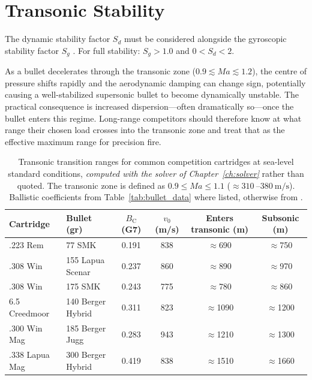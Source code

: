 \documentclass[11pt,twoside,openright]{report}
\newcommand{\Bc}{B_{\mathrm{C}}}
\newcommand{\Mach}{\mathit{Ma}}
\begin{document}
\section{Transonic Stability}

The dynamic stability factor $S_d$ must be considered alongside the gyroscopic stability factor $S_g$ \citep{mccoy1999modern}. For full stability: $S_g > 1.0$ and $0 < S_d < 2$.

As a bullet decelerates through the transonic zone ($0.9 \lesssim \Mach \lesssim 1.2$), the centre of pressure shifts rapidly and the aerodynamic damping can change sign, potentially causing a well-stabilized supersonic bullet to become dynamically unstable. The practical consequence is increased dispersion---often dramatically so---once the bullet enters this regime. Long-range competitors should therefore know at what range their chosen load crosses into the transonic zone and treat that as the effective maximum range for precision fire.

\begin{table}[H]
\centering
\caption{Transonic transition ranges for common competition cartridges at sea-level standard conditions, \emph{computed with the solver of Chapter~\ref{ch:solver}} rather than quoted. The transonic zone is defined as $0.9 \leq \Mach \leq 1.1$ ($\approx\SI{310}{}$--$\SI{380}{\meter\per\second}$). Ballistic coefficients from Table~\ref{tab:bullet_data} where listed, otherwise from \citet{litz2015ballistic}.}
\label{tab:transonic_ranges}
\small
\begin{tabular}{@{}llcccc@{}}
\toprule
\textbf{Cartridge} & \textbf{Bullet (gr)} & \textbf{$\Bc$ (G7)} & \textbf{$v_0$ (m/s)} & \textbf{Enters transonic (m)} & \textbf{Subsonic (m)} \\
\midrule
.223 Rem        & 77 SMK            & 0.191 & 838 & $\approx$690  & $\approx$750 \\
.308 Win        & 155 Lapua Scenar  & 0.237 & 860 & $\approx$890  & $\approx$970 \\
.308 Win        & 175 SMK           & 0.243 & 775 & $\approx$780  & $\approx$860 \\
6.5 Creedmoor   & 140 Berger Hybrid & 0.311 & 823 & $\approx$1090 & $\approx$1200 \\
.300 Win Mag    & 185 Berger Jugg   & 0.283 & 943 & $\approx$1210 & $\approx$1300 \\
.338 Lapua Mag  & 300 Berger Hybrid & 0.419 & 838 & $\approx$1510 & $\approx$1660 \\
\bottomrule
\end{tabular}
\end{table}
\end{document}
